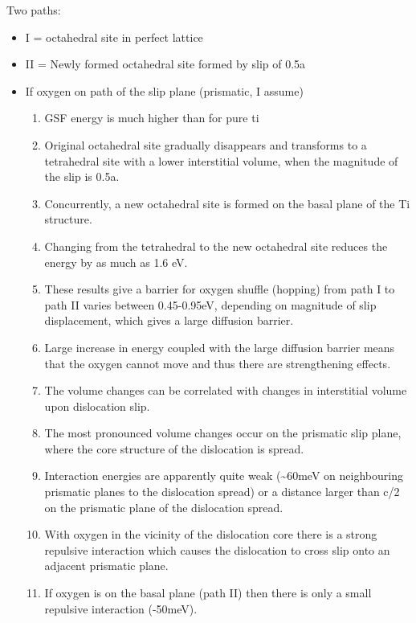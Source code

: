 \documentclass[a4paper,12pt,oneside,print,numbered,index,PageStyleIII]{PhDThesisPSnPDF}
\begin{document}
Two paths: 
\begin{itemize}
\item I  = octahedral site in perfect lattice
\item II = Newly formed octahedral site formed by slip of 0.5a

\item If oxygen on path of the slip plane (prismatic, I assume)
\begin{enumerate}
\item GSF energy is much higher than for pure ti
\item Original octahedral site gradually disappears and transforms
to a tetrahedral site with a lower interstitial volume, when
the magnitude of the slip is 0.5a.
\item Concurrently, a new octahedral site is formed on the basal
plane of the Ti structure.
\item Changing from the tetrahedral to the new octahedral site
reduces the energy by as much as 1.6 eV.
\item These results give a barrier for oxygen shuffle (hopping) from
path I to path II varies between 0.45-0.95eV, depending on
magnitude of slip displacement, which gives a large diffusion
barrier.
\item Large increase in energy coupled with the large diffusion
barrier means that the oxygen cannot move and thus there are
strengthening effects.
\item The volume changes can be correlated with changes in
interstitial volume upon dislocation slip.
\item The most pronounced volume changes occur on the prismatic slip
plane, where the core structure of the dislocation is spread.
\item Interaction energies are apparently quite weak (\textasciitilde{}60meV on neighbouring
prismatic planes to the dislocation spread) or a distance
larger than c/2 on the prismatic plane of the dislocation
spread.
\item With oxygen in the vicinity of the dislocation core there is
a strong repulsive interaction which causes the dislocation
to cross slip onto an adjacent prismatic plane.
\item If oxygen is on the basal plane (path II) then there is only
a small repulsive interaction (-50meV).
\end{enumerate}
\end{itemize}
\end{document}
